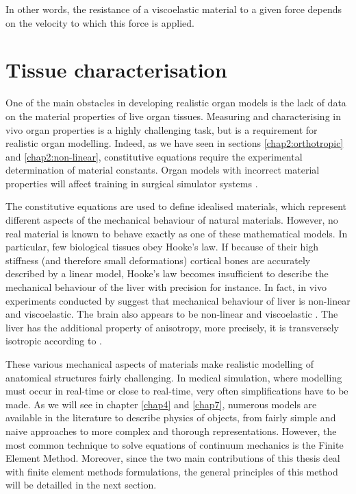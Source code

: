 In other words, the resistance of a viscoelastic material to a given force depends on the velocity to which this force is applied. 


			
\section{Tissue characterisation}
One of the main obstacles in developing realistic organ models is the lack of data on the material properties of live organ tissues. Measuring and characterising in vivo organ properties is a highly challenging task, but is a requirement for realistic organ modelling. Indeed, as we have seen in sections \ref{chap2:orthotropic} and \ref{chap2:non-linear}, constitutive equations require the experimental determination of material constants. Organ models with incorrect material properties will affect training in surgical simulator systems \citep{Sedef06}.

The constitutive equations are used to define idealised materials, which represent different aspects of the mechanical behaviour of natural materials. However, no real material is known to behave exactly as one of these mathematical models. In particular, few biological tissues obey Hooke's law. If because of their high stiffness (and therefore small deformations) cortical bones are accurately described by a linear model, Hooke's law becomes insufficient to describe the mechanical behaviour of the liver with precision for instance. In fact, in vivo experiments conducted by \cite{Melvin73} suggest that mechanical behaviour of liver is non-linear and viscoelastic. The brain also appears to be non-linear and viscoelastic \citep{Miller97}. The liver has the additional property of anisotropy, more precisely, it is transversely isotropic according to \cite{Chui07}. 

These various mechanical aspects of materials make realistic modelling of anatomical structures fairly challenging. In medical simulation, where modelling must occur in real-time or close to real-time, very often simplifications have to be made. As we will see in chapter \ref{chap4} and \ref{chap7}, numerous models are available in the literature to describe physics of objects, from fairly simple and naive approaches to more complex and thorough representations. However, the most common technique to solve equations of continuum mechanics is the Finite Element Method. Moreover, since the two main contributions of this thesis deal with finite element methods formulations, the general principles of this method will be detailled in the next section. 

